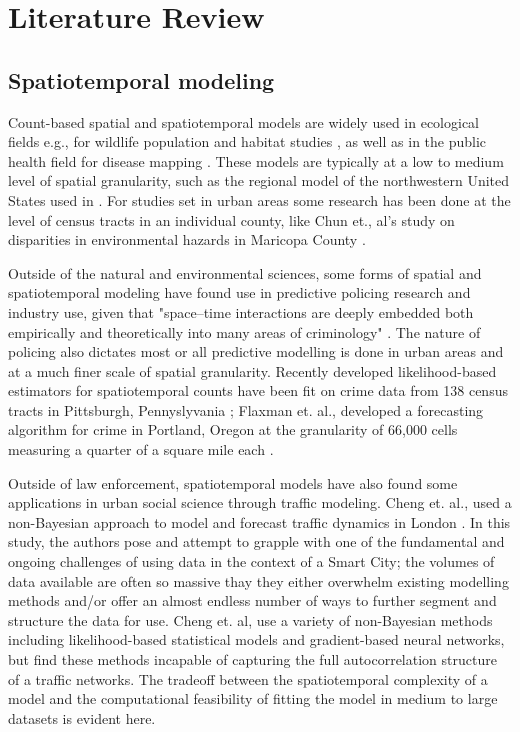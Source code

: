 
\section{Literature Review}
\label{literature_review}

\subsection{Spatiotemporal modeling}

Count-based spatial and spatiotemporal models are widely used in ecological fields e.g., for wildlife population and habitat studies \cite{cobi_2008}, as well as in the public health field for disease mapping \cite{schrodle_2011}. These models are typically at a low to medium level of spatial granularity, such as the regional model of the northwestern United States used in \cite{cobi_2008}. For studies set in urban areas some research has been done at the level of census tracts in an individual county, like Chun et., al's study on disparities in environmental hazards in Maricopa County \cite{chun_2012}. \par

Outside of the natural and environmental sciences, some forms of spatial and spatiotemporal modeling have found use in predictive policing research and industry use, given that "space–time interactions are deeply embedded both empirically and theoretically into many areas of criminology" \cite{li_2014}. The nature of policing also dictates most or all predictive modelling is done in urban areas and at a much finer scale of spatial granularity. Recently developed likelihood-based estimators for spatiotemporal counts have been fit on crime data from 138 census tracts in Pittsburgh, Pennyslyvania \cite{liesenfeld_2017}; Flaxman et. al., developed a forecasting algorithm for crime in Portland, Oregon at the granularity of 66,000 cells measuring a quarter of a square mile each \cite{flaxman_2018}.
 \par

Outside of law enforcement, spatiotemporal models have also found some applications in urban social science through traffic modeling. Cheng et. al., used a non-Bayesian approach to model and forecast traffic dynamics in London \cite{cheng_2012}. In this study, the authors pose and attempt to grapple with one of the fundamental and ongoing challenges of using data in the context of a Smart City; the volumes of data available are often so massive thay they either overwhelm existing modelling methods and/or offer an almost endless number of ways to further segment and structure the data for use. Cheng et. al, use a variety of non-Bayesian methods including likelihood-based statistical models and gradient-based neural networks, but find these methods incapable of capturing the full autocorrelation structure of a traffic networks. The tradeoff between the spatiotemporal complexity of a model and the computational feasibility of fitting the model in medium to large datasets is evident here. \par

